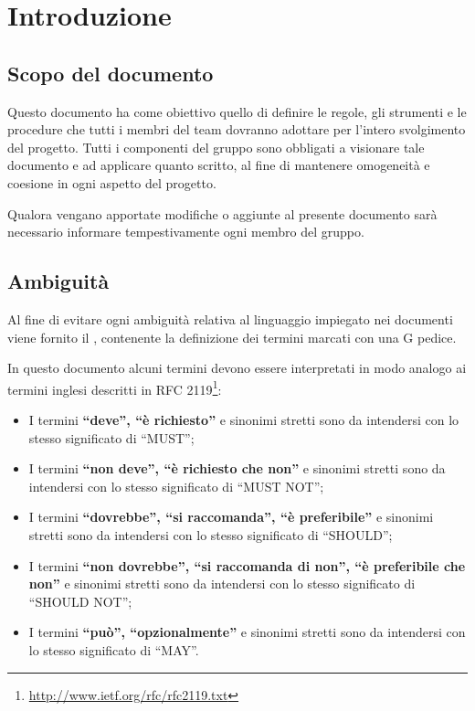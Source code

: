 \section{Introduzione}

\subsection{Scopo del documento}

Questo documento ha come obiettivo quello di definire le regole, gli strumenti e le procedure che tutti i membri del team dovranno adottare per l'intero svolgimento del progetto. Tutti i componenti del gruppo sono obbligati a visionare tale documento e ad applicare quanto scritto, al fine di mantenere omogeneità e coesione in ogni aspetto del progetto.

Qualora vengano apportate modifiche o aggiunte al presente documento sarà necessario informare tempestivamente ogni membro del gruppo.

\subsection{Ambiguità}

Al fine di evitare ogni ambiguità relativa al linguaggio impiegato nei documenti viene fornito il \Glossario{}, contenente la definizione dei termini marcati con una G pedice.

In questo documento alcuni termini devono essere interpretati in modo analogo ai termini inglesi descritti in RFC 2119\footnote{\url{http://www.ietf.org/rfc/rfc2119.txt}}:
\begin{itemize}
 \item I termini \textbf{``deve'', ``è richiesto''} e sinonimi stretti sono da intendersi con lo stesso significato di ``MUST'';
 \item I termini \textbf{``non deve'', ``è richiesto che non''} e sinonimi stretti sono da intendersi con lo stesso significato di ``MUST NOT'';
 \item I termini \textbf{``dovrebbe'', ``si raccomanda'', ``è preferibile''} e sinonimi stretti sono da intendersi con lo stesso significato di ``SHOULD'';
 \item I termini \textbf{``non dovrebbe'', ``si raccomanda di non'', ``è preferibile che non''} e sinonimi stretti sono da intendersi con lo stesso significato di ``SHOULD NOT'';
 \item I termini \textbf{``può'', ``opzionalmente''} e sinonimi stretti sono da intendersi con lo stesso significato di ``MAY''.
\end{itemize}
